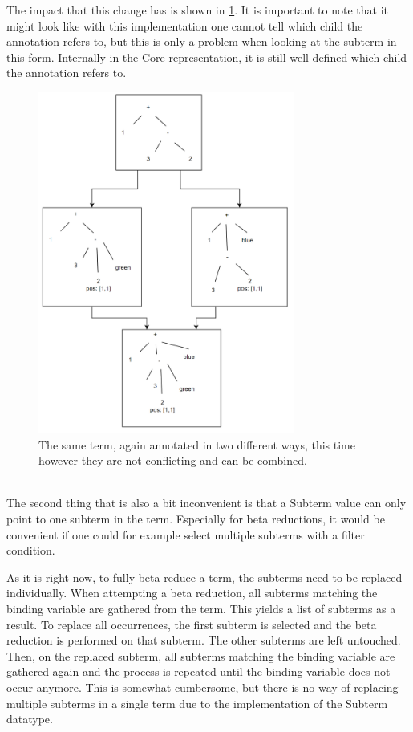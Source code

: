 The impact that this change has is shown in \ref*{fig:highlightMismatchResolved}.
It is important to note that it might look like with this implementation one cannot tell which child the annotation refers to,
but this is only a problem when looking at the subterm in this form.
Internally in the Core representation, it is still well-defined which child the annotation refers to.

\begin{figure}[!ht]
    \includegraphics[width=0.75\textwidth]{resources/highlighting_mismatch_resolved.png}
    \caption{The same term, again annotated in two different ways, this time however they are not conflicting and can be combined.}
    \label{fig:highlightMismatchResolved}
\end{figure}

\ \\
The second thing that is also a bit inconvenient is that a Subterm value can only point to one subterm in the term.
Especially for beta reductions,
it would be convenient if one could for example select multiple subterms with a filter condition.

As it is right now,
to fully beta-reduce a term,
the subterms need to be replaced individually.
When attempting a beta reduction,
all subterms matching the binding variable are gathered from the term.
This yields a list of subterms as a result.
To replace all occurrences,
the first subterm is selected and the beta reduction is performed on that subterm.
The other subterms are left untouched.
Then, on the replaced subterm,
all subterms matching the binding variable are gathered again and the process is repeated until the binding variable does not occur anymore.
This is somewhat cumbersome,
but there is no way of replacing multiple subterms in a single term due to the implementation of the Subterm datatype.

